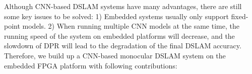 
Although CNN-based DSLAM systems have many advantages, there are still some key issues to be solved: 1) Embedded systems usually only support fixed-point models. 2) When running multiple CNN models at the same time, the running speed of the system on embedded platforms will decrease, and the slowdown of DPR will lead to the degradation of the final DSLAM accuracy. Therefore, we build up a CNN-based monocular DSLAM system on the embedded FPGA platform with following contributions:

